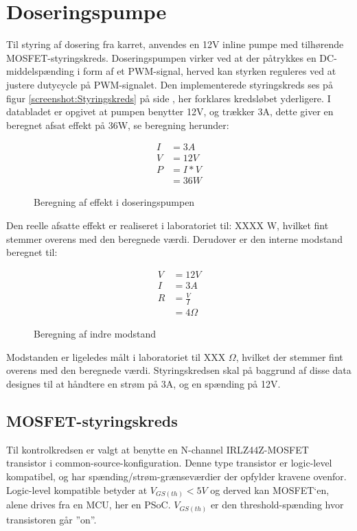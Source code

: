 
\section{Doseringspumpe}
Til styring af dosering fra karret, anvendes en 12V inline pumpe  med tilhørende MOSFET-styringskreds. 
Doseringspumpen virker ved at der påtrykkes en DC-middelspænding i form af et PWM-signal, herved kan styrken reguleres ved at justere dutycycle på PWM-signalet.
Den implementerede styringskreds ses på figur \ref{screenshot:Styringskreds} på side \pageref{screenshot:Styringskreds}, her forklares kredsløbet yderligere.
I databladet er opgivet at pumpen benytter 12V, og trækker 3A, dette giver en beregnet afsat effekt på 36W, se beregning herunder:

\begin{figure}[!h]
    \begin{align*}
        I &= 3 A \\ 
        V &= 12 V \\
        P &= I*V \\ 
        &= 36W
    \end{align*}
\label{eq:PumpeA}
\caption{Beregning af effekt i doseringspumpen}
\end{figure}

Den reelle afsatte effekt er realiseret i laboratoriet til: XXXX W, hvilket fint stemmer overens med den beregnede værdi. 
Derudover er den interne modstand beregnet til:

\begin{figure}[!h]
	\begin{align*}
   		V &= 12 V \\ 
        I &= 3 A \\
        R &= \frac{V}{I} \\ 
        &= 4 \Omega
  	\end{align*}
\label{eq:pumpeOhm}
\caption{Beregning af indre modstand}
\end{figure}

Modstanden er ligeledes målt i laboratoriet til XXX $\Omega$, hvilket der stemmer fint overens med den beregnede værdi.
Styringskredsen skal på baggrund af disse data designes til at håndtere en strøm på 3A, og en spænding på 12V. 


\newpage
\subsection{MOSFET-styringskreds}
Til kontrolkredsen er valgt at benytte en N-channel IRLZ44Z-MOSFET transistor i common-source-konfiguration. Denne type transistor er logic-level kompatibel, og har spænding/strøm-grænseværdier der opfylder kravene ovenfor.  
Logic-level kompatible betyder at $ V_{GS(th)} < 5V $ og derved kan MOSFET`en, alene drives fra en MCU, her en PSoC.
$ V_{GS(th)} $ er den threshold-spænding hvor transistoren går ”on”.


